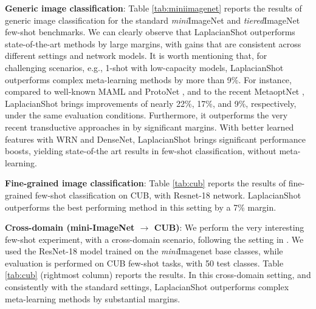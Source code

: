 \documentclass{article}
\begin{document}
\textbf{Generic image classification}: Table \ref{tab:miniimagenet} reports the results of generic image classification for the standard \textit{mini}ImageNet and \textit{tiered}ImageNet few-shot benchmarks. We can clearly observe that LaplacianShot outperforms state-of-the-art methods by large margins, with gains that are consistent across different settings and network models. It is worth mentioning that, for challenging scenarios, e.g., 1-shot with low-capacity models, LaplacianShot outperforms complex meta-learning methods by more than 9\%. For instance, compared to well-known MAML \cite{Finn2017ModelAgnosticMF} and ProtoNet \cite{snell2017prototypical}, and to the recent MetaoptNet \cite{lee2019meta}, LaplacianShot brings improvements of nearly 22\%, 17\%, and 9\%, respectively, under the same evaluation conditions. Furthermore, it outperforms the very recent transductive approaches in \cite{Dhillon2020A,liu2019prototype,liu2018learning} by significant margins. 
With better learned features with WRN and DenseNet, LaplacianShot brings significant performance boosts, yielding state-of-the art results in few-shot classification, without meta-learning. 

\textbf{Fine-grained image classification}:  Table \ref{tab:cub} reports the results of fine-grained few-shot classification on CUB, with Resnet-18 network. LaplacianShot outperforms the best performing method in this setting by a 7\% margin.

\textbf{Cross-domain (mini-ImageNet $\rightarrow$ CUB)}: We perform the very interesting few-shot experiment, with a cross-domain scenario, following the setting in \cite{chen2018a}. We used the ResNet-18 model trained on the \textit{mini}Imagenet base classes, while evaluation is performed on CUB few-shot tasks, with 50 test classes. Table \ref{tab:cub} (rightmost column) reports the results. In this cross-domain setting, and consistently with the standard settings, LaplacianShot  outperforms complex meta-learning methods by substantial margins. 
\end{document}
